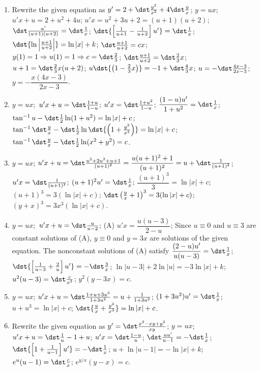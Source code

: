\documentclass[openany]{book}
\newenvironment{sectionSolutions}{
 \begin{enumerate}[item-label={\thesection.\arabic{enumi}.}]
}{
 \end{enumerate}
}
\begin{document}
\begin{sectionSolutions}
\item
Rewrite the given equation as $y'=2+\dst\frac{y^2}{
x^2}+4\dst\frac{y}{ x}$;\;
$y=ux$;\ $u'x+u=2+u^2+4u$;\;
$u'x=u^2+3u+2=(u+1)(u+2)$;\;
$\dst\frac{u'}{(u+1)(u+2)}=\dst\frac{1}{ x}$;\;
$\dst{\left[\frac{1}{ u+1}-\frac{1}{ u+2}\right]u'}=\dst\frac{1}{ x}$;\;
$\dst{\ln\left|\frac{u+1}{ u+2}\right|}=\ln|x|+k$;\;
$\dst\frac{u+1}{ u+2}=cx$;\;
$y(1)=1\Rightarrow u(1)=1\Rightarrow c=\dst\frac{2}{3}$;\;
$\dst\frac{u+1}{ u+2}=\dst\frac{2}{3}x$;\;
$u+1=\dst\frac{2}{3}x(u+2)$;\;
$u\dst{\left(1-\frac{2}{3}x\right)}=-1+\dst\frac{4}{3}x$;\;
$u=-\dst\frac{4x-3}{2x-3}$;\;
$y=-\dfrac{x(4x-3)}{2x-3}$.

\item
$y=ux$;\ $u'x+u=\dst\frac{1+u}{1-u}$;\;
$u'x=\dst\frac{1+u^2}{1-u}$;\;
$\dfrac{(1-u)u'}{1+u^2}=\dst\frac{1}{ x}$;\;
$\tan^{-1}u-\dst\frac{1}{2}\ln(1+u^2)=\ln|x|+c$;\;
$\tan^{-1}\dst\frac{y}{
x}-\dst\frac{1}{2}\ln\dst{\left(1+\frac{y^2}{ x^2}\right)}=\ln|x|+c$;\;
$\tan^{-1}\dst\frac{y}{
x}-\dst\frac{1}{2}\ln(x^2+y^2)=c$.

\item
$y=ux$;
$u'x+u=\dst\frac{u^3+2u^2+u+1}{(u+1)^2}=\dfrac{u(u+1)^2+1}{(u+1)^2}
=u+\dst\frac{1}{(u+1)^2}$;
$u'x=\dst\frac{1}{(u+1)^2}$;\;
$(u+1)^2u'=\dst\frac{1}{ x}$;\;
$\dfrac{(u+1)^3}{3}=\ln|x|+c$;\;
$(u+1)^3=3(\ln|x|+c)$;\;
$\dst\left(\frac{y}{ x}+1\right)^3=3(\ln|x|+c)$;\;
$(y+x)^3=3x^3(\ln|x|+c)$.



\item
$y=ux$;\ $u'x+u=\dst\frac{u}{ u-2}$;\;
(A)  $u'x=\dfrac{u(u-3)}{2-u}$;\;
Since $u\equiv0$ and $u\equiv3$
are constant solutions of (A), $y\equiv0$ and
$y=3x$ are solutions of the given equation.
The nonconstant solutions of (A) satisfy
$\dfrac{(2-u)u'}{ u(u-3)}=\dst\frac{1}{ x}$;\;
$\dst{\left[\frac{1}{ u-3}+\frac{2}{
u}\right]u'}=-\dst\frac{3}{ x}$;\;
$\ln|u-3|+2\ln|u|=-3\ln|x|+k$;\;
$u^2(u-3)=\dst\frac{c}{ x^3}$;\;
$y^2(y-3x)=c$.


\item
$y=ux$;\;
$u'x+u=
\dst \frac{1+u+3u^3 }{ 1+3u^2}=u+\frac{1 }{ 1+3u^2}$;\;
$(1+3u^2)u'=\dst\frac{1}{ x}$;\;
$u+u^3=\ln |x|+c$;\;
$\dst{\frac{y}{ x}+\frac{y^3}{ x^3}}=\ln |x|+c$.


\item
Rewrite the given equation as $y'=\dst\frac{x^2-xy+y^2}{ xy}$;\;
$y=ux$;\ $u'x+u=\dst\frac{1}{ u}-1+u$;\;
$u'x=\dst\frac{1-u}{ u}$;\;
$\dst\frac{uu'}{ u-1}=-\dst\frac{1}{ x}$;\;
$\dst{\left[1+\frac{1}{ u-1}\right]u'}=-\dst\frac{1}{ x}$;\;
$u+\ln|u-1|=-\ln|x|+k$;\;
$e^u(u-1)=\dst\frac{c}{ x}$;\;
$e^{y/x}(y-x)=c$.




\end{sectionSolutions}
\end{document}
